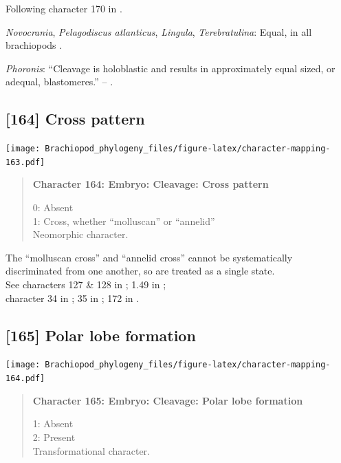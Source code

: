 \documentclass[openany]{book}
\begin{document}
Following character 170 in \citet{Giribet2002}.

\hypertarget{Lingula-coding-163}{}
\emph{Novocrania}, \emph{Pelagodiscus atlanticus}, \emph{Lingula},
\emph{Terebratulina}: Equal, in all brachiopods
\citep{Williams1997Introduction}.

\hypertarget{Phoronis-coding-163}{}
\emph{Phoronis}: ``Cleavage is holoblastic and results in approximately
equal sized, or adequal, blastomeres.'' -- \citet{Pennerstorfer2012}.

\subsection*{{[}164{]} Cross pattern}\label{cross-pattern}

\texttt{[image: Brachiopod\_phylogeny\_files/figure-latex/character-mapping-163.pdf]}

\begin{quote}
\textbf{Character 164: Embryo: Cleavage: Cross pattern}

0: Absent\\
1: Cross, whether ``molluscan'' or ``annelid''\\
Neomorphic character.
\end{quote}

The ``molluscan cross'' and ``annelid cross'' cannot be systematically
discriminated from one another, so are treated as a single state.\\
See characters 127 \& 128 in \citet{Rouse1999}; 1.49 in
\citet{SPS1996};\\
character 34 in \citet{Haszprunar1996}; 35 in \citet{Haszprunar2000};
172 in \citet{Giribet2002}.

\subsection*{{[}165{]} Polar lobe formation}\label{polar-lobe-formation}

\texttt{[image: Brachiopod\_phylogeny\_files/figure-latex/character-mapping-164.pdf]}

\begin{quote}
\textbf{Character 165: Embryo: Cleavage: Polar lobe formation}

1: Absent\\
2: Present\\
Transformational character.
\end{quote}
\end{document}
